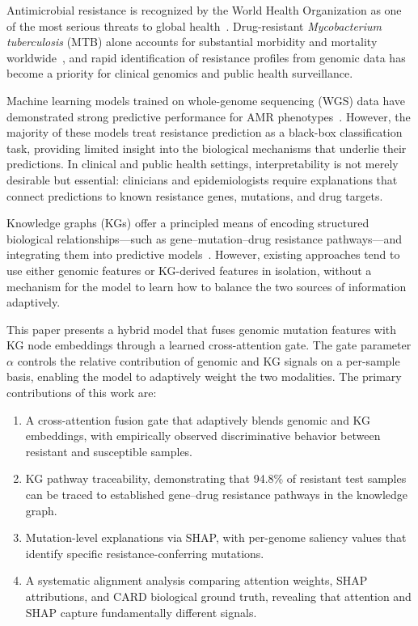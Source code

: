 \documentclass[conference]{IEEEtran}
\begin{document}
Antimicrobial resistance is recognized by the World Health Organization as one of the most serious threats to global health~\cite{ref_who_amr}. Drug-resistant \textit{Mycobacterium tuberculosis} (MTB) alone accounts for substantial morbidity and mortality worldwide~\cite{ref_tb_burden}, and rapid identification of resistance profiles from genomic data has become a priority for clinical genomics and public health surveillance.

Machine learning models trained on whole-genome sequencing (WGS) data have demonstrated strong predictive performance for AMR phenotypes~\cite{ref_ml_amr_review}. However, the majority of these models treat resistance prediction as a black-box classification task, providing limited insight into the biological mechanisms that underlie their predictions. In clinical and public health settings, interpretability is not merely desirable but essential: clinicians and epidemiologists require explanations that connect predictions to known resistance genes, mutations, and drug targets.

Knowledge graphs (KGs) offer a principled means of encoding structured biological relationships---such as gene--mutation--drug resistance pathways---and integrating them into predictive models~\cite{ref_kg_biomed}. However, existing approaches tend to use either genomic features or KG-derived features in isolation, without a mechanism for the model to learn how to balance the two sources of information adaptively.

This paper presents a hybrid model that fuses genomic mutation features with KG node embeddings through a learned cross-attention gate. The gate parameter $\alpha$ controls the relative contribution of genomic and KG signals on a per-sample basis, enabling the model to adaptively weight the two modalities. The primary contributions of this work are:

\begin{enumerate}
    \item A cross-attention fusion gate that adaptively blends genomic and KG embeddings, with empirically observed discriminative behavior between resistant and susceptible samples.
    \item KG pathway traceability, demonstrating that 94.8\% of resistant test samples can be traced to established gene--drug resistance pathways in the knowledge graph.
    \item Mutation-level explanations via SHAP, with per-genome saliency values that identify specific resistance-conferring mutations.
    \item A systematic alignment analysis comparing attention weights, SHAP attributions, and CARD biological ground truth, revealing that attention and SHAP capture fundamentally different signals.
\end{enumerate}
\end{document}

